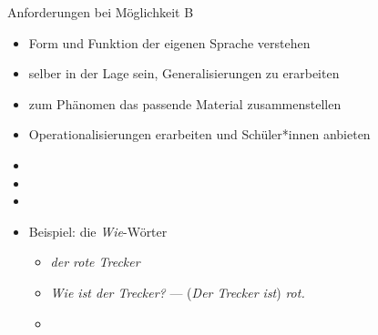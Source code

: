 \begin{frame}
  {Anforderungen bei Möglichkeit B}
  \pause
    \begin{itemize}[<+->]
      \item \alert{Form und Funktion der eigenen Sprache verstehen}
      \item selber in der Lage sein, \alert{Generalisierungen zu erarbeiten}
      \item zum Phänomen \alert{das passende Material zusammenstellen}
      \item \alert{Operationalisierungen} erarbeiten und Schüler*innen anbieten
        \Halbzeile
      \item {}
        \Halbzeile
      \item {}
        \Halbzeile
      \item {}
      \Halbzeile
    \item Beispiel: die \textit{Wie}-Wörter
      \begin{itemize}[<+->]
        \item \textit{der rote Trecker}
        \item \textit{Wie ist der Trecker?} --- \alert{(\textit{Der Trecker ist}) \textit{rot.}}
        \item {}
      \end{itemize}
  \end{itemize}
\end{frame}

